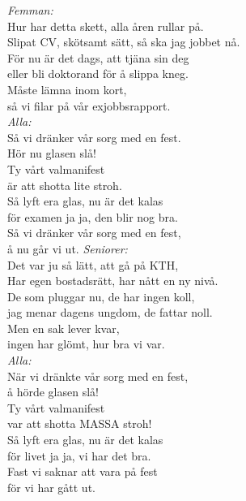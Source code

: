 \documentclass[a6paper,10pt]{article}
\begin{document}
\begin{lyrics}
\textit{Femman:} \\
Hur har detta skett, alla åren rullar på. \\
Slipat CV, skötsamt sätt, så ska jag jobbet nå. \\
För nu är det dags, att tjäna sin deg \\
eller bli doktorand för å slippa kneg. \\
Måste lämna inom kort,  \\
så vi filar på vår exjobbsrapport.
\vspace{5pt} \\
\textit{Alla:} \\
Så vi dränker vår sorg med en fest. \\
Hör nu glasen slå! \\
Ty vårt valmanifest \\
är att shotta lite stroh. \\
Så lyft era glas, nu är det kalas \\
för examen ja ja, den blir nog bra. \\
Så vi dränker vår sorg med en fest, \\
å nu går vi ut.
\newpage
\setlength{\oddsidemargin}{-0.47in}
\noindent
\textit{Seniorer:} \\
Det var ju så lätt, att gå på KTH, \\
Har egen bostadsrätt, har nått en ny nivå. \\
De som pluggar nu, de har ingen koll, \\
jag menar dagens ungdom, de fattar noll. \\
Men en sak lever kvar,  \\
ingen har glömt, hur bra vi var.
\vspace{5pt} \\
\textit{Alla:} \\
När vi dränkte vår sorg med en fest, \\
å hörde glasen slå! \\
Ty vårt valmanifest \\
var att shotta MASSA stroh! \\
Så lyft era glas, nu är det kalas \\
för livet ja ja, vi har det bra. \\
Fast vi saknar att vara på fest \\
för vi har gått ut.
\end{lyrics}

\end{document}
